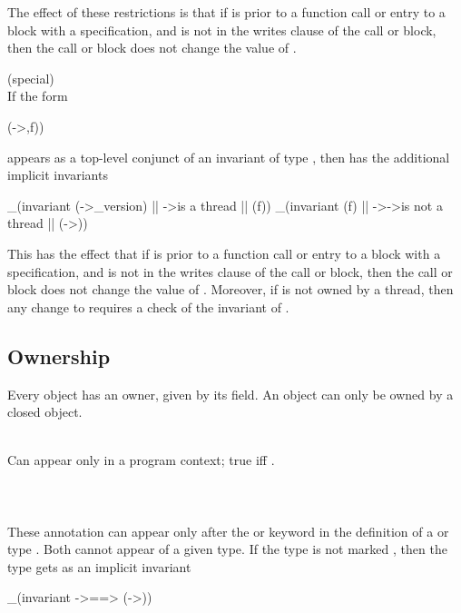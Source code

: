 \documentclass[preprint,nocopyrightspace]{sigplanconf}
\begin{document}
{The effect of these restrictions is that if  is \vcc{\wrapped}
prior to a function call or entry to a block with a specification,
and  is not in the writes clause of the call or block, then the
call or block does not change the value of .

 (special)\\

If the form
\begin{VCC}
  \approves(\this->\owner,f))
\end{VCC}
appears as a top-level conjunct of an invariant of type ,
then  has the additional implicit invariants
\begin{VCC}
  _(invariant \unchanged(\this->\volatile_version)
      || \this->\owner is a thread
      ||  \unchanged(f))
  _(invariant \unchanged(f) 
      || \this->\owner->\type is not a thread
      || (\this->\owner))
\end{VCC}

This has the effect that if  is \vcc{\wrapped}
prior to a function call or entry to a block with a specification,
and  is not in the writes clause of the call or block, then the
call or block does not change the value of . Moreover, if
 is not owned by a thread, then any change to 
requires a check of the invariant of .

\subsection{Ownership}
Every object has an owner, given by its \vcc{\owner} field. An object
can only be owned by a closed object. 

\noindent{}\\
Can appear only in a program context;
true iff .
\\\\
\noindent{}\\
\\
These annotation can appear only after the  or 
keyword in the definition of a  or 
type . Both cannot appear of a given type. If the type is not
marked , then the type gets as an implicit
invariant
\begin{VCC}
  _(invariant \this->\closed ==> \unchanged(\this->\owns))
\end{VCC}

}
\end{document}

